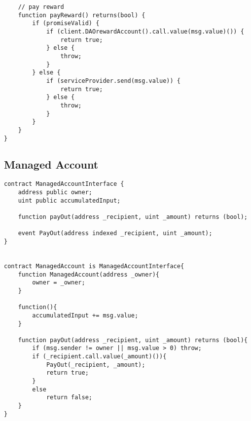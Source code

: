 \documentclass[9pt,oneside]{amsart}
\begin{document}
\begin{appendix}
\begin{verbatim}
    // pay reward
    function payReward() returns(bool) {
        if (promiseValid) {
            if (client.DAOrewardAccount().call.value(msg.value)()) {
                return true;
            } else {
                throw;
            }
        } else {
            if (serviceProvider.send(msg.value)) {
                return true;
            } else {
                throw;
            }
        }
    }
}
\end{verbatim}


\subsection{Managed Account}\label{app:ManagedAccount}
\begin{verbatim}
contract ManagedAccountInterface {
    address public owner;
    uint public accumulatedInput;

    function payOut(address _recipient, uint _amount) returns (bool);

    event PayOut(address indexed _recipient, uint _amount);
}


contract ManagedAccount is ManagedAccountInterface{
    function ManagedAccount(address _owner){
        owner = _owner;
    }

    function(){
        accumulatedInput += msg.value;
    }

    function payOut(address _recipient, uint _amount) returns (bool){
        if (msg.sender != owner || msg.value > 0) throw;
        if (_recipient.call.value(_amount)()){
            PayOut(_recipient, _amount);
            return true;
        }
        else
            return false;
    }
}
\end{verbatim}
\end{appendix}
\end{document}
